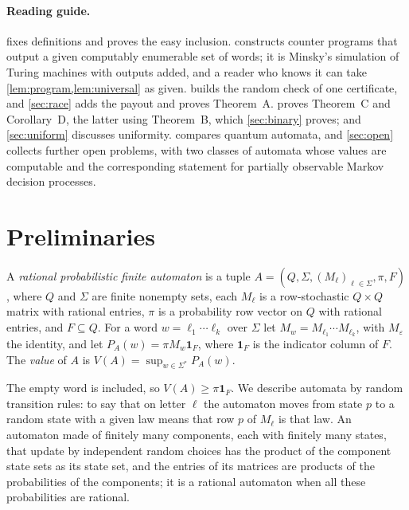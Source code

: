 \documentclass[11pt]{article}
\theoremstyle{plain}
\theoremstyle{definition}
\theoremstyle{remark}
\newcommand{\ind}{\mathbf 1}
\newcommand{\eps}{\varepsilon}
\begin{document}
\paragraph{Reading guide.}  fixes definitions and proves the easy inclusion.  constructs counter programs that output a given computably enumerable set of words; it is Minsky's simulation of Turing machines with outputs added, and a reader who knows it can take \cref{lem:program,lem:universal} as given.  builds the random check of one certificate, and \cref{sec:race} adds the payout and proves Theorem~A.  proves Theorem~C and Corollary~D, the latter using Theorem~B, which \cref{sec:binary} proves; and \cref{sec:uniform} discusses uniformity.  compares quantum automata, and \cref{sec:open} collects further open problems, with two classes of automata whose values are computable and the corresponding statement for partially observable Markov decision processes.

\section{Preliminaries}\label{sec:prelim}

\begin{definition}\label{def:pfa}
A \emph{rational probabilistic finite automaton} is a tuple $A=(Q,\Sigma,(M_\ell)_{\ell\in\Sigma},\pi,F)$, where $Q$ and $\Sigma$ are finite nonempty sets, each $M_\ell$ is a row-stochastic $Q\times Q$ matrix with rational entries, $\pi$ is a probability row vector on $Q$ with rational entries, and $F\subseteq Q$. For a word $w=\ell_1\cdots\ell_k$ over $\Sigma$ let $M_w=M_{\ell_1}\cdots M_{\ell_k}$, with $M_\eps$ the identity, and let $P_A(w)=\pi M_w\ind_F$, where $\ind_F$ is the indicator column of $F$. The \emph{value} of $A$ is $V(A)=\sup_{w\in\Sigma^*}P_A(w)$.
\end{definition}

The empty word is included, so $V(A)\ge\pi\ind_F$. We describe automata by random transition rules: to say that on letter $\ell$ the automaton moves from state $p$ to a random state with a given law means that row $p$ of $M_\ell$ is that law. An automaton made of finitely many components, each with finitely many states, that update by independent random choices has the product of the component state sets as its state set, and the entries of its matrices are products of the probabilities of the components; it is a rational automaton when all these probabilities are rational.
\end{document}

